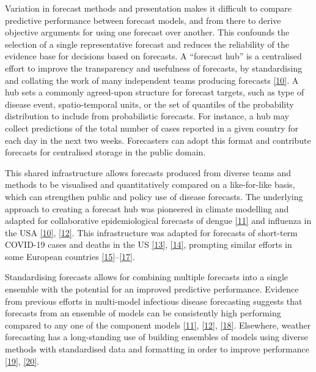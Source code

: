 \documentclass[
]{article}
\begin{document}
Variation in forecast methods and presentation makes it difficult to compare predictive performance between forecast models, and from there to derive objective arguments for using one forecast over another. This confounds the selection of a single representative forecast and reduces the reliability of the evidence base for decisions based on forecasts. A ``forecast hub'' is a centralised effort to improve the transparency and usefulness of forecasts, by standardising and collating the work of many independent teams producing forecasts \protect\hyperlink{ref-reichCollaborativeMultiyearMultimodel2019}{{[}10{]}}. A hub sets a commonly agreed-upon structure for forecast targets, such as type of disease event, spatio-temporal units, or the set of quantiles of the probability distribution to include from probabilistic forecasts. For instance, a hub may collect predictions of the total number of cases reported in a given country for each day in the next two weeks. Forecasters can adopt this format and contribute forecasts for centralised storage in the public domain.

This shared infrastructure allows forecasts produced from diverse teams and methods to be visualised and quantitatively compared on a like-for-like basis, which can strengthen public and policy use of disease forecasts. The underlying approach to creating a forecast hub was pioneered in climate modelling and adapted for collaborative epidemiological forecasts of dengue \protect\hyperlink{ref-johanssonOpenChallengeAdvance2019}{{[}11{]}} and influenza in the USA \protect\hyperlink{ref-reichCollaborativeMultiyearMultimodel2019}{{[}10{]}}, \protect\hyperlink{ref-reichAccuracyRealtimeMultimodel2019}{{[}12{]}}. This infrastructure was adapted for forecasts of short-term COVID-19 cases and deaths in the US \protect\hyperlink{ref-cramerUnitedStatesCOVID192021}{{[}13{]}}, \protect\hyperlink{ref-rayEnsembleForecastsCoronavirus2020e}{{[}14{]}}, prompting similar efforts in some European countries \protect\hyperlink{ref-bracherPreregisteredShorttermForecasting2021}{{[}15{]}}--\protect\hyperlink{ref-bicherSupportingCOVID19PolicyMaking2021}{{[}17{]}}.

Standardising forecasts allows for combining multiple forecasts into a single ensemble with the potential for an improved predictive performance. Evidence from previous efforts in multi-model infectious disease forecasting suggests that forecasts from an ensemble of models can be consistently high performing compared to any one of the component models \protect\hyperlink{ref-johanssonOpenChallengeAdvance2019}{{[}11{]}}, \protect\hyperlink{ref-reichAccuracyRealtimeMultimodel2019}{{[}12{]}}, \protect\hyperlink{ref-viboudRAPIDDEbolaForecasting2018}{{[}18{]}}. Elsewhere, weather forecasting has a long-standing use of building ensembles of models using diverse methods with standardised data and formatting in order to improve performance \protect\hyperlink{ref-buizzaIntroductionSpecialIssue2019}{{[}19{]}}, \protect\hyperlink{ref-moranEpidemicForecastingMessier2016}{{[}20{]}}.
\end{document}
